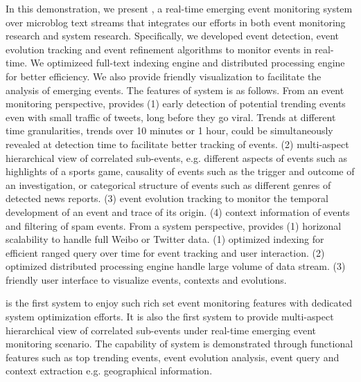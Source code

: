 In this demonstration, we present \ring, a real-time emerging event monitoring system over microblog text streams that integrates our efforts in both event monitoring research and system research.
Specifically, we developed event detection, event evolution tracking and event refinement algorithms to monitor events in real-time.
We optimizeed full-text indexing engine and distributed processing engine for better efficiency. 
We also provide friendly visualization to facilitate the analysis of emerging events.
The features of \ring system is as follows.
From an event monitoring perspective, \ring provides
(1) early detection of potential trending events even with small traffic of tweets, long before they go viral. Trends at different time granularities, \ie trends over 10 minutes or 1 hour, could be simultaneously revealed at detection time to facilitate better tracking of events.
(2) multi-aspect hierarchical view of correlated sub-events, e.g. different aspects of events such as highlights of a sports game, causality of events such as the trigger and outcome of an investigation, or categorical structure of events such as different genres of detected news reports.
(3) event evolution tracking to monitor the temporal development of an event and trace of its origin.
(4) context information of events and filtering of spam events.
From a system perspective, \ring provides
(1) horizonal scalability to handle full Weibo or Twitter data.
(1) optimized indexing for efficient ranged query over time for event tracking and user interaction.
(2) optimized distributed processing engine handle large volume of data stream.
(3) friendly user interface to visualize events, contexts and evolutions.

\ring is the first system to enjoy such rich set event monitoring features with dedicated system optimization efforts.
It is also the first system to provide multi-aspect hierarchical view of correlated sub-events under real-time emerging event monitoring scenario.
The capability of \ring system is demonstrated through functional features such as top trending events, event evolution analysis, event query and context extraction e.g. geographical information.

